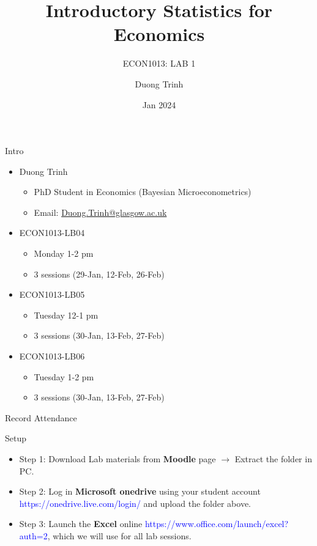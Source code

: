 \documentclass[
  10pt,
  ignorenonframetext,
]{beamer}
\title{Introductory Statistics for Economics}
\subtitle{ECON1013: LAB 1}
\author{Duong Trinh}
\date{Jan 2024}
\institute{University of Glasgow}
\providecommand{\tightlist}{%
  \setlength{\itemsep}{0pt}\setlength{\parskip}{0pt}}
\begin{document}
\frame{\titlepage}

\begin{frame}{Intro}
\protect\hypertarget{intro}{}
\begin{itemize}
\tightlist
\item
  Duong Trinh

  \begin{itemize}
  \tightlist
  \item
    PhD Student in Economics (Bayesian Microeconometrics)
  \item
    Email: \underline{Duong.Trinh@glasgow.ac.uk}
  \end{itemize}
\end{itemize}

\vspace{3mm}

\begin{itemize}
\tightlist
\item
  ECON1013-LB04

  \begin{itemize}
  \tightlist
  \item
    Monday 1-2 pm
  \item
    3 sessions (29-Jan, 12-Feb, 26-Feb)
  \end{itemize}
\item
  ECON1013-LB05

  \begin{itemize}
  \tightlist
  \item
    Tuesday 12-1 pm
  \item
    3 sessions (30-Jan, 13-Feb, 27-Feb)
  \end{itemize}
\item
  ECON1013-LB06

  \begin{itemize}
  \tightlist
  \item
    Tuesday 1-2 pm
  \item
    3 sessions (30-Jan, 13-Feb, 27-Feb)
  \end{itemize}
\end{itemize}

\vspace{3mm}
\end{frame}

\begin{frame}{Record Attendance}
\protect\hypertarget{record-attendance}{}
\end{frame}

\begin{frame}{Setup}
\protect\hypertarget{setup}{}
\begin{itemize}
\item
  Step 1: Download Lab materials from \textbf{Moodle} page
  \(\rightarrow\) Extract the folder in PC.
\item
  Step 2: Log in \textbf{Microsoft onedrive} using your student account
  \textcolor{blue}{https://onedrive.live.com/login/} and upload the
  folder above.
\item
  Step 3: Launch the \textbf{Excel} online
  \textcolor{blue}{https://www.office.com/launch/excel?auth=2}, which we
  will use for all lab sessions.
\end{itemize}
\end{frame}
\end{document}
